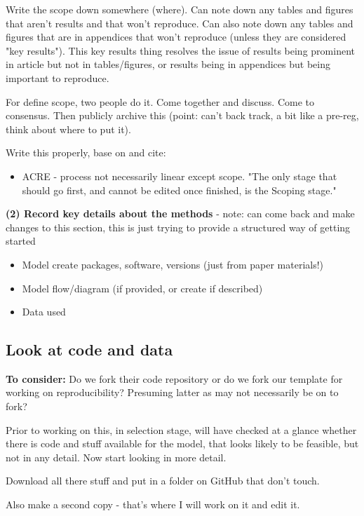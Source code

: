 Write the scope down somewhere (where). Can note down any tables and figures that aren't results and that won't reproduce. Can also note down any tables and figures that are in appendices that won't reproduce (unless they are considered "key results"). This key results thing resolves the issue of results being prominent in article but not in tables/figures, or results being in appendices but being important to reproduce.

For define scope, two people do it. Come together and discuss. Come to consensus. Then publicly archive this (point: can't back track, a bit like a pre-reg, think about where to put it).

Write this properly, base on and cite:
\begin{itemize}
    \item ACRE - process not necessarily linear except scope. "The only stage that should go first, and cannot be edited once finished, is the Scoping stage."\cite{berkeley_initiative_for_transparency_in_the_social_sciences_guide_2022}
\end{itemize}

\textbf{(2) Record key details about the methods} - note: can come back and make changes to this section, this is just trying to provide a structured way of getting started
\begin{itemize}
    \item Model create packages, software, versions (just from paper materials!)
    \item Model flow/diagram (if provided, or create if described)
    \item Data used
\end{itemize}

\subsection{Look at code and data} 

\textbf{To consider:} Do we fork their code repository or do we fork our template for working on reproducibility? Presuming latter as may not necessarily be on to fork?

Prior to working on this, in selection stage, will have checked at a glance whether there is code and stuff available for the model, that looks likely to be feasible, but not in any detail. Now start looking in more detail.

Download all there stuff and put in a folder on GitHub that don't touch.

Also make a second copy - that's where I will work on it and edit it.

